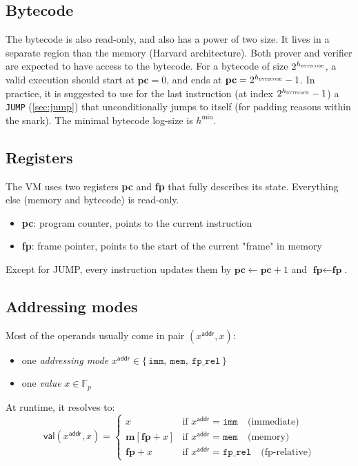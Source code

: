 \documentclass{article}
\theoremstyle{definition}
\newcommand{\Fp}{\mathbb F_p}
\begin{document}
\subsection{Bytecode}

The bytecode is also read-only, and also has a power of two size. It lives in a separate region than the memory (Harvard architecture). Both prover and verifier are expected to have access to the bytecode. For a bytecode of size $2^{h_\textsc{bytecode}}$, a valid execution should start at $\textbf{pc} = 0$, and ends at $\textbf{pc} = 2^{h_\textsc{bytecode}} - 1$. In practice, it is suggested to use for the last instruction (at index $2^{h_\textsc{bytecode}} - 1$) a \texttt{JUMP} (\cref{sec:jump}) that unconditionally jumps to itself (for padding reasons within the snark). The minimal bytecode log-size is $h^{\min}$.

\subsection{Registers}

The VM uses two registers \textbf{pc} and \textbf{fp} that fully describes its state. Everything else (memory and bytecode) is read-only.

\begin{itemize}
    \item \textbf{pc}: program counter, points to the current instruction
    \item \textbf{fp}: frame pointer, points to the start of the current "frame" in memory
\end{itemize}

 Except for JUMP, every instruction updates them by $\textbf{pc} \gets \textbf{pc} + 1$ and $\textbf{fp} \gets \textbf{fp}$.



\subsection{Addressing modes}

Most of the operands usually come in pair $(x^\textsf{addr}, x)$:
\begin{itemize}
    \item one \textit{addressing mode} $x^\textsf{addr} \in \{\,\texttt{imm},\ \texttt{mem},\ \texttt{fp\_rel}\,\}$
    \item one \textit{value} $x \in \Fp$
\end{itemize}

At runtime, it resolves to:
\[
\mathsf{val}(x^\textsf{addr}, x) =
\begin{cases}
x & \text{if } x^\textsf{addr} = \texttt{imm} \quad \text{(immediate)} \\
\textbf{m}[\textbf{fp} + x] & \text{if } x^\textsf{addr} = \texttt{mem} \quad \text{(memory)} \\
\textbf{fp} + x & \text{if } x^\textsf{addr} = \texttt{fp\_rel} \quad \text{(fp-relative)}
\end{cases}
\]
\end{document}
